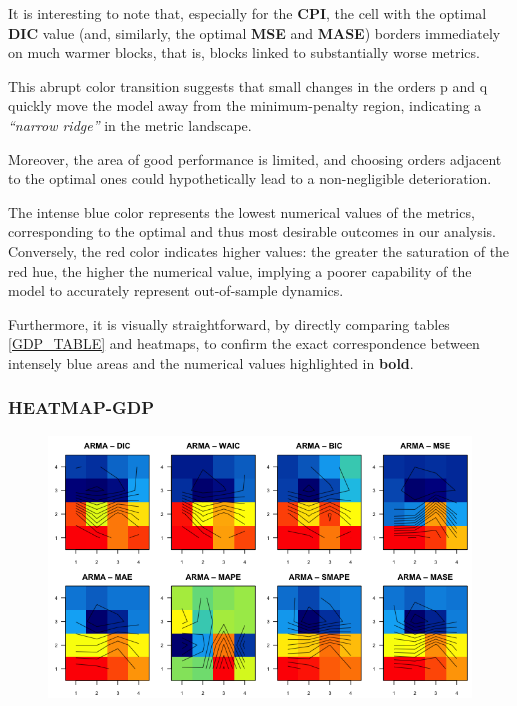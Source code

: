 \documentclass{Configuration_Files/PoliMi3i_thesis}
\begin{document}
It is interesting to note that, especially for the \textbf{CPI}, the cell with the optimal \textbf{DIC} value (and, similarly, the optimal \textbf{MSE} and \textbf{MASE}) borders immediately on much warmer blocks, that is, blocks linked to substantially worse metrics. 

This abrupt color transition suggests that small changes in the orders p and q quickly move the model away from the minimum-penalty region, indicating a \textit{“narrow ridge”} in the metric landscape. 


Moreover, the area of good performance is limited, and choosing orders adjacent to the optimal ones could hypothetically lead to a non-negligible deterioration.


The intense blue color represents the lowest numerical values of the metrics, corresponding to the optimal and thus most desirable outcomes in our analysis. Conversely, the red color indicates higher values: the greater the saturation of the red hue, the higher the numerical value, implying a poorer capability of the model to accurately represent out-of-sample dynamics.

Furthermore, it is visually straightforward, by directly comparing tables \ref{GDP_TABLE} and heatmaps, to confirm the exact correspondence between intensely blue areas and the numerical values highlighted in \textbf{bold}.
\newpage
\subsubsection{HEATMAP-GDP}
\begin{figure}[H]
    \centering
    \includegraphics[width=0.75\linewidth]{HEATMAP-CORRETTO.png}
\end{figure}
\end{document}
